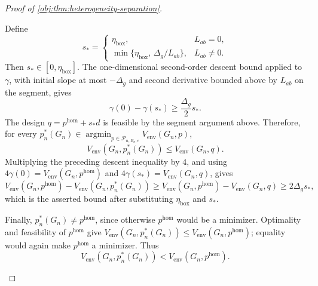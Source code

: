 \documentclass[11pt]{article}
\begin{document}
\begin{proof}[Proof of \cref{obj:thm:heterogeneity-separation}]
\begin{enumerate}
Define
\[
s_*= 
\begin{cases}
\eta_{\mathrm{box}}, & L_{ab}=0,\\
\min\{\eta_{\mathrm{box}},\,\Delta_g/L_{ab}\}, & L_{ab}\ne0 .
\end{cases}
\]
Then \(s_*\in[0,\eta_{\mathrm{box}}]\).  The one-dimensional second-order descent bound applied to \(\gamma\), with initial slope at most \(-\Delta_g\) and second derivative bounded above by \(L_{ab}\) on the segment, gives
\[
\gamma(0)-\gamma(s_*)\ge \frac{\Delta_g}{2}s_*.
\]
The design \(q=p^{\mathrm{hom}}+s_*d\) is feasible by the segment argument above.  Therefore, for every
\(p_n^*(G_n)\in\operatorname{argmin}_{p\in\mathcal P_{n,B_n,\epsilon}}
V_{\mathrm{env}}(G_n,p)\),
\[
V_{\mathrm{env}}(G_n,p_n^*(G_n))
\le V_{\mathrm{env}}(G_n,q).
\]
Multiplying the preceding descent inequality by \(4\), and using \(4\gamma(0)=V_{\mathrm{env}}(G_n,p^{\mathrm{hom}})\) and \(4\gamma(s_*)=V_{\mathrm{env}}(G_n,q)\), gives
\[
V_{\mathrm{env}}(G_n,p^{\mathrm{hom}})
-
V_{\mathrm{env}}(G_n,p_n^*(G_n))
\ge
V_{\mathrm{env}}(G_n,p^{\mathrm{hom}})
-
V_{\mathrm{env}}(G_n,q)
\ge 2\Delta_gs_* ,
\]
which is the asserted bound after substituting \(\eta_{\mathrm{box}}\) and \(s_*\).

Finally, \(p_n^*(G_n)\neq p^{\mathrm{hom}}\), since otherwise
\(p^{\mathrm{hom}}\) would be a minimizer.  Optimality and feasibility of \(p^{\mathrm{hom}}\) give
\(V_{\mathrm{env}}(G_n,p_n^*(G_n))\le V_{\mathrm{env}}(G_n,p^{\mathrm{hom}})\); equality would again make \(p^{\mathrm{hom}}\) a minimizer.  Thus
\[
V_{\mathrm{env}}(G_n,p_n^*(G_n))
<
V_{\mathrm{env}}(G_n,p^{\mathrm{hom}}).
\]


\end{enumerate}
\end{proof}
\end{document}
